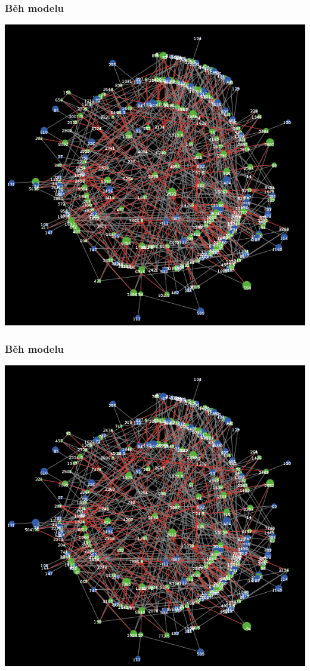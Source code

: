 \documentclass[xcolor=dvipsnames]{beamer}
\begin{document}
  \begin{frame}
    \frametitle{Běh modelu}
    \includegraphics[width=0.6\paperwidth]{6.png}
  \end{frame}
    \begin{frame}
    \frametitle{Běh modelu}
    \includegraphics[width=0.6\paperwidth]{7.png}
  \end{frame}
\end{document}
